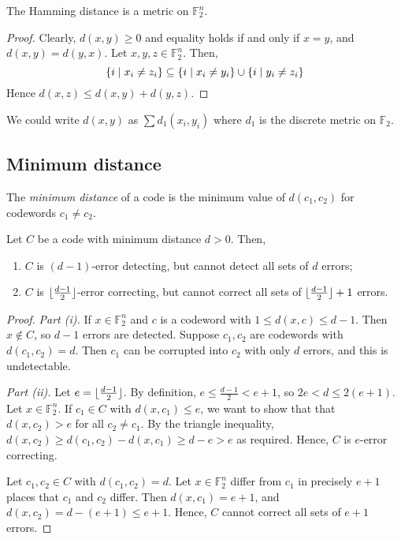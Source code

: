 \begin{lemma}
    The Hamming distance is a metric on \( \mathbb F_2^n \).
\end{lemma}
\begin{proof}
    Clearly, \( d(x,y) \geq 0 \) and equality holds if and only if \( x = y \), and \( d(x,y) = d(y,x) \).
    Let \( x, y, z \in \mathbb F_2^n \).
    Then,
    \[ \qty{i \mid x_i \neq z_i} \subseteq \qty{i \mid x_i \neq y_i} \cup \qty{i \mid y_i \neq z_i} \]
    Hence \( d(x,z) \leq d(x,y) + d(y,z) \).
\end{proof}
\begin{remark}
    We could write \( d(x,y) \) as \( \sum d_1(x_i,y_i) \) where \( d_1 \) is the discrete metric on \( \mathbb F_2 \).
\end{remark}

\subsection{Minimum distance}
\begin{definition}
    The \emph{minimum distance} of a code is the minimum value of \( d(c_1, c_2) \) for codewords \( c_1 \neq c_2 \).
\end{definition}
\begin{lemma}
    Let \( C \) be a code with minimum distance \( d > 0 \).
    Then,
    \begin{enumerate}
        \item \( C \) is \( (d-1) \)-error detecting, but cannot detect all sets of \( d \) errors;
        \item \( C \) is \( \lfloor\frac{d-1}{2}\rfloor \)-error correcting, but cannot correct all sets of \( \lfloor\frac{d-1}{2}\rfloor + 1 \) errors.
    \end{enumerate}
\end{lemma}
\begin{proof}
    \emph{Part (i).}
    If \( x \in \mathbb F_2^n \) and \( c \) is a codeword with \( 1 \leq d(x,c) \leq d - 1 \).
    Then \( x \not\in C \), so \( d - 1 \) errors are detected.
    Suppose \( c_1, c_2 \) are codewords with \( d(c_1, c_2) = d \).
    Then \( c_1 \) can be corrupted into \( c_2 \) with only \( d \) errors, and this is undetectable.

    \emph{Part (ii).}
    Let \( e = \lfloor\frac{d-1}{2}\rfloor \).
    By definition, \( e \leq \frac{d-1}{2} < e + 1 \), so \( 2e < d \leq 2(e+1) \).
    Let \( x \in \mathbb F_2^n \).
    If \( c_1 \in C \) with \( d(x,c_1) \leq e \), we want to show that that \( d(x,c_2) > e \) for all \( c_2 \neq c_1 \).
    By the triangle inequality, \( d(x,c_2) \geq d(c_1,c_2) - d(x,c_1) \geq d - e > e \) as required.
    Hence, \( C \) is \( e \)-error correcting.

    Let \( c_1, c_2 \in C \) with \( d(c_1, c_2) = d \).
    Let \( x \in \mathbb F_2^n \) differ from \( c_1 \) in precisely \( e + 1 \) places that \( c_1 \) and \( c_2 \) differ.
    Then \( d(x,c_1) = e + 1 \), and \( d(x,c_2) = d - (e+1) \leq e + 1 \).
    Hence, \( C \) cannot correct all sets of \( e + 1 \) errors.
\end{proof}
